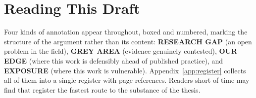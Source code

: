 \listoffigures
\listoftables

\section*{Reading This Draft}

Four kinds of annotation appear throughout, boxed and numbered, marking the structure of the
argument rather than its content: \textbf{RESEARCH GAP} (an open problem in the field),
\textbf{GREY AREA} (evidence genuinely contested), \textbf{OUR EDGE} (where this work is
defensibly ahead of published practice), and \textbf{EXPOSURE} (where this work is
vulnerable). Appendix~\ref{app:register} collects all of them into a single register with
page references. Readers short of time may find that register the fastest route to the
substance of the thesis.


